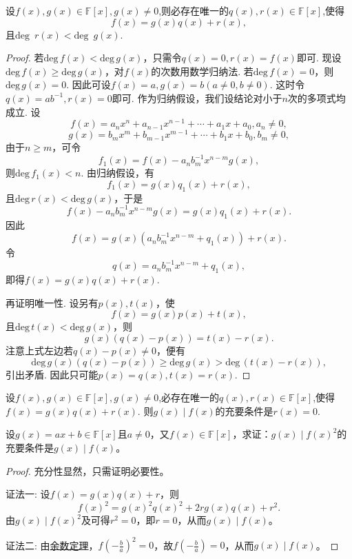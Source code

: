 \documentclass[../../main.tex]{subfiles}%
\begin{document}
\begin{theorem}[多项式的带余除法]\label{theorem:多项式的带余除法}
设\(f(x),g(x)\in\mathbb{F}[x],g(x)\neq 0\),则必存在唯一的\(q(x),r(x)\in\mathbb{F}[x]\),使得
\[
f(x)=g(x)q(x)+r(x),
\]
且\(\text{deg }\,r(x)<\text{deg }\,g(x)\).
\end{theorem}
\begin{proof}
若\(\mathrm{deg }\,f(x)<\mathrm{deg }\,g(x)\)，只需令\(q(x)=0,r(x)=f(x)\)即可.
现设\(\mathrm{deg }\,f(x)\geqslant \mathrm{deg }\,g(x)\)，对\(f(x)\)的次数用数学归纳法. 若\(\mathrm{deg }\,f(x)=0\)，则\(\mathrm{deg }\,g(x)=0\). 因此可设\(f(x)=a,g(x)=b(a\neq 0,b\neq 0)\). 这时令\(q(x)=ab^{-1},r(x)=0\)即可. 作为归纳假设，我们设结论对小于\(n\)次的多项式均成立. 设
\[
f(x)=a_nx^n + a_{n - 1}x^{n - 1}+\cdots+a_1x + a_0, a_n\neq 0,
\]
\[
g(x)=b_mx^m + b_{m - 1}x^{m - 1}+\cdots+b_1x + b_0, b_m\neq 0,
\]
由于\(n\geqslant  m\)，可令
\[
f_1(x)=f(x)-a_nb_m^{-1}x^{n - m}g(x),
\]
则\(\mathrm{deg }\,f_1(x)<n\). 由归纳假设，有
\[
f_1(x)=g(x)q_1(x)+r(x),
\]
且\(\mathrm{deg }\,r(x)<\mathrm{deg }\,g(x)\)，于是
\[
f(x)-a_nb_m^{-1}x^{n - m}g(x)=g(x)q_1(x)+r(x).
\]
因此
\[
f(x)=g(x)(a_nb_m^{-1}x^{n - m}+q_1(x))+r(x).
\]
令
\[
q(x)=a_nb_m^{-1}x^{n - m}+q_1(x),
\]
即得$f(x)=g(x)q(x)+r(x)$.

再证明唯一性. 设另有\(p(x),t(x)\)，使
\[
f(x)=g(x)p(x)+t(x),
\]
且\(\mathrm{deg }\,t(x)<\mathrm{deg }\,g(x)\)，则
\[
g(x)(q(x)-p(x))=t(x)-r(x).
\]
注意上式左边若\(q(x)-p(x)\neq 0\)，便有
\[
\mathrm{deg }\,g(x)(q(x)-p(x))\geqslant \mathrm{deg }\,g(x)>\mathrm{deg }\,(t(x)-r(x)),
\]
引出矛盾. 因此只可能\(p(x)=q(x),t(x)=r(x)\).
\end{proof}

\begin{corollary}\label{corollary:整除关于多项式的带余除法的充要条件}
设\(f(x),g(x)\in\mathbb{F}[x],g(x)\neq 0\),必存在唯一的\(q(x),r(x)\in\mathbb{F}[x]\),使得$f(x)=g(x)q(x)+r(x)$. 
则\(g(x)\mid f(x)\)的充要条件是\(r(x)=0\).
\end{corollary}

\begin{example}
设\(g(x)=ax + b\in\mathbb{F}[x]\)且\(a\neq0\)，又\(f(x)\in\mathbb{F}[x]\)，求证：\(g(x)\mid f(x)^2\)的充要条件是\(g(x)\mid f(x)\)。
\end{example}
\begin{proof}
充分性显然，只需证明必要性。

{\color{blue}证法一:}
设\(f(x)=g(x)q(x)+r\)，则
\[
f(x)^2 = g(x)^2q(x)^2 + 2rg(x)q(x)+r^2.
\]
由\(g(x)\mid f(x)^2\)及可得\(r^2 = 0\)，即\(r = 0\)，从而\(g(x)\mid f(x)\)。

{\color{blue}证法二:}
由\hyperref[theorem:余数定理]{余数定理}，\(f\left(-\frac{b}{a}\right)^2 = 0\)，故\(f\left(-\frac{b}{a}\right)= 0\)，从而\(g(x)\mid f(x)\)。
\end{proof}
\end{document}
